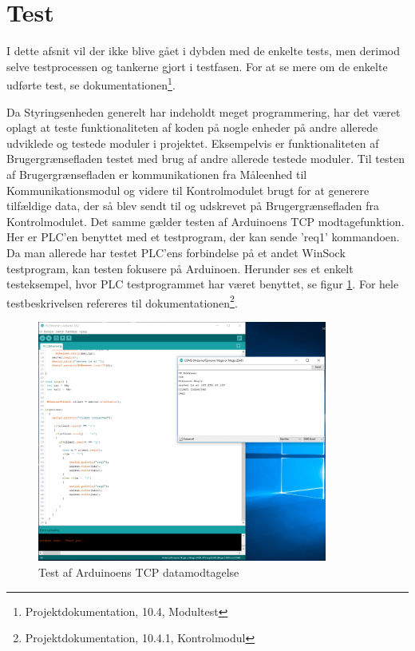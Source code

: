 
\section{Test}

I dette afsnit vil der ikke blive gået i dybden med de enkelte tests, men derimod selve testprocessen og tankerne gjort i testfasen. For at se mere om de enkelte udførte test, se dokumentationen\footnote{Projektdokumentation, 10.4, Modultest}.

Da Styringsenheden generelt har indeholdt meget programmering, har det været oplagt at teste funktionaliteten af koden på nogle enheder på andre allerede udviklede og testede moduler i projektet.  Eksempelvis er funktionaliteten af Brugergrænsefladen testet med brug af andre allerede testede moduler. Til testen af Brugergrænsefladen er kommunikationen fra Måleenhed til Kommunikationsmodul og videre til Kontrolmodulet brugt for at generere tilfældige data, der så blev sendt til og udskrevet på Brugergrænsefladen fra Kontrolmodulet. Det samme gælder testen af Arduinoens TCP modtagefunktion. Her er PLC'en benyttet  med et testprogram, der kan sende 'req1' kommandoen. Da man allerede har testet PLC'ens forbindelse på et andet WinSock testprogram\cite{WinSock}, kan testen fokusere på Arduinoen. Herunder ses et enkelt testeksempel, hvor PLC testprogrammet har været benyttet, se figur \ref{fig:EthernetTest}. For hele testbeskrivelsen refereres til dokumentationen\footnote{Projektdokumentation, 10.4.1, Kontrolmodul}.


\begin{figure}[H] %
	\centering
	\includegraphics[width=0.85\textwidth]{figure/EthernetTest}
	\caption{Test af Arduinoens TCP datamodtagelse}
	\label{fig:EthernetTest}
\end{figure}